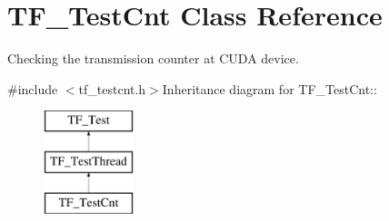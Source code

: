 \hypertarget{classTF__TestCnt}{
\section{TF\_\-TestCnt Class Reference}
\label{classTF__TestCnt}
}


Checking the transmission counter at CUDA device.  


{\ttfamily \#include $<$tf\_\-testcnt.h$>$}Inheritance diagram for TF\_\-TestCnt::\begin{figure}[H]
\begin{center}
\leavevmode
\includegraphics[height=3cm]{classTF__TestCnt}
\end{center}
\end{figure}
